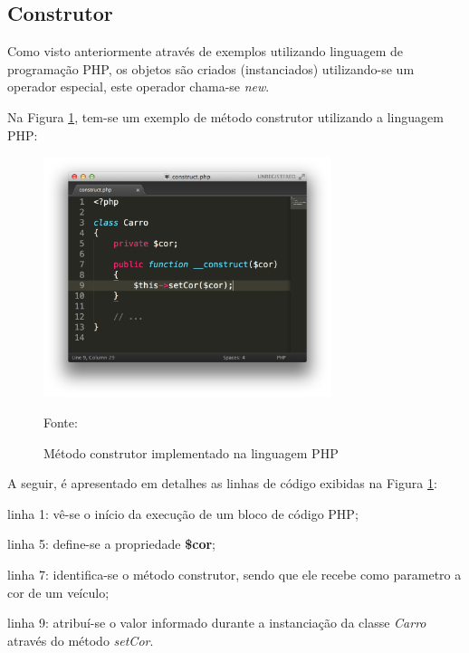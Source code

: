\subsection{Construtor}

Como visto anteriormente através de exemplos utilizando linguagem de
programação \acs{PHP}, os objetos são criados (instanciados) utilizando-se um
operador especial, este operador chama-se \textit{new}.


Na Figura \ref{fig:metodoConstrutor}, tem-se um exemplo de método construtor
utilizando a linguagem \acs{PHP}:

\begin{figure}[h!tb]
	\caption{Método construtor implementado na linguagem PHP}
	\label{fig:metodoConstrutor}

	\centering
	\includegraphics[width=0.75\textwidth]{images/construct.png}

	\centering
	\footnotesize Fonte: \fonteOAutor
\end{figure}

\FloatBarrier 	%

A seguir, é apresentado em detalhes as linhas de código exibidas na Figura
\ref{fig:metodoConstrutor}:

\begin{alineas}
    \item linha 1: vê-se o início da execução de um bloco de código PHP;
    \item linha 5: define-se a propriedade \textbf{\$cor};
    \item linha 7: identifica-se o método construtor, sendo que ele recebe como
    parametro a cor de um veículo;
    \item linha 9: atribuí-se o valor informado durante a instanciação da classe
    \textit{Carro} através do método \textit{setCor}.
\end{alineas}

